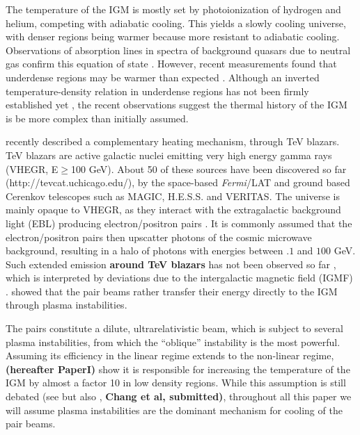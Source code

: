 \documentclass[twocolumns]{emulateapj}
\newcommand\ALc[1]{{\color{red} \bf #1}} %
\begin{document}
The temperature of the IGM is mostly set by photoionization of hydrogen  and helium, competing with adiabatic cooling. This yields a slowly cooling universe, with denser regions being warmer because more resistant to adiabatic cooling. Observations of absorption lines in spectra of background quasars due to neutral gas confirm this equation of state \citep{2000MNRAS.318..817S,2000ApJ...534...41R,2012ApJ...757L..30R}. However, recent measurements found that underdense regions may be warmer than expected \citep{2009MNRAS.399L..39V,2008MNRAS.386.1131B,2014MNRAS.441.1916B}. Although an inverted temperature-density relation in underdense regions has not been firmly established yet \citep{2014MNRAS.tmp...52B}, the recent observations suggest the thermal history of the IGM is be more complex than initially assumed.



\citet{2012ApJ...752...22B} recently described a complementary heating mechanism, through TeV blazars. TeV blazars are active galactic nuclei emitting  very high energy gamma rays (VHEGR, E$\ge$100 GeV). About 50 of these sources have been discovered so far (http://tevcat.uchicago.edu/), by the space-based \textit{Fermi}/LAT and ground based Cerenkov telescopes such as MAGIC, H.E.S.S. and VERITAS. The universe is mainly opaque to  VHEGR, as they interact with the extragalactic background light (EBL) producing electron/positron pairs \citep{1967PhRv..155.1408G,1992ApJ...390L..49S}.  It is commonly assumed that the electron/positron pairs then upscatter photons of the cosmic microwave background, resulting in  a halo of photons with energies between $.1$ and $100$ GeV. Such extended emission \ALc{around TeV blazars} has not been observed so far \citep{2010A&A...524A..77A,2014arXiv1401.2915H}, which is interpreted by deviations due to the intergalactic magnetic field (IGMF) \citep{2013A&ARv..21...62D,2012ApJ...747L..14V,2011ApJ...733L..21D}. \citet{2012ApJ...752...22B} showed that the pair beams rather transfer their energy directly to the IGM through plasma instabilities.

The pairs constitute a dilute, ultrarelativistic beam, which is subject to several plasma instabilities, from which the ``oblique'' instability \citep{PhysRevE.70.046401} is the most powerful. Assuming its efficiency in the linear regime extends to the non-linear regime, \citet{2012ApJ...752...23C} \ALc{(hereafter PaperI)} show it is responsible for increasing the temperature of the IGM by almost a factor 10 in low density regions. While this assumption is still debated (see \citet{2013ApJ...770...54M,2014ApJ...787...49S} but also \citet{2013arXiv1311.6752S,2013ApJ...777...49S,2012ApJ...758..102S}, \ALc{Chang et al, submitted)}, throughout all this paper we will assume plasma instabilities are the dominant mechanism for cooling of the pair beams.
\end{document}
